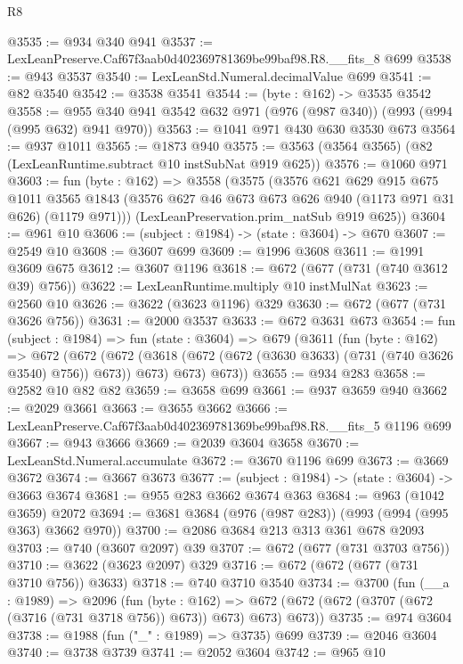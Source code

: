\begin{lexlean}{R8}
\begin{coremodule}
@3535 := @934 @340 @941
@3537 := LexLeanPreserve.Caf67f3aab0d402369781369be99baf98.R8.__fits_8 @699
@3538 := @943 @3537
@3540 := LexLeanStd.Numeral.decimalValue @699
@3541 := @82 @3540
@3542 := @3538 @3541
@3544 := (byte : @162) -> @3535 @3542
@3558 := @955 @340 @941 @3542 @632 @971 (@976 (@987 @340)) (@993 (@994 (@995 @632) @941 @970))
@3563 := @1041 @971 @430 @630 @3530 @673
@3564 := @937 @1011
@3565 := @1873 @940
@3575 := @3563 (@3564 @3565) (@82 (LexLeanRuntime.subtract @10 instSubNat @919 @625))
@3576 := @1060 @971
@3603 := fun (byte : @162) =>
  @3558
    (@3575
      (@3576
        @621
        @629
        @915
        @675
        @1011
        @3565
        @1843
        (@3576 @627 @46 @673 @673 @626 @940 (@1173 @971 @31 @626) (@1179 @971)))
      (LexLeanPreservation.prim_natSub @919 @625))
@3604 := @961 @10
@3606 := (subject : @1984) -> (state : @3604) -> @670
@3607 := @2549 @10
@3608 := @3607 @699
@3609 := @1996 @3608
@3611 := @1991 @3609 @675
@3612 := @3607 @1196
@3618 := @672 (@677 (@731 (@740 @3612 @39) @756))
@3622 := LexLeanRuntime.multiply @10 instMulNat
@3623 := @2560 @10
@3626 := @3622 (@3623 @1196) @329
@3630 := @672 (@677 (@731 @3626 @756))
@3631 := @2000 @3537
@3633 := @672 @3631 @673
@3654 := fun (subject : @1984) =>
  fun (state : @3604) =>
  @679
    (@3611
      (fun (byte : @162) =>
      @672
        (@672
          (@672 (@3618 (@672 (@672 (@3630 @3633) (@731 (@740 @3626 @3540) @756)) @673)) @673)
          @673)
        @673))
@3655 := @934 @283
@3658 := @2582 @10 @82 @82
@3659 := @3658 @699
@3661 := @937 @3659 @940
@3662 := @2029 @3661
@3663 := @3655 @3662
@3666 := LexLeanPreserve.Caf67f3aab0d402369781369be99baf98.R8.__fits_5 @1196 @699
@3667 := @943 @3666
@3669 := @2039 @3604 @3658
@3670 := LexLeanStd.Numeral.accumulate
@3672 := @3670 @1196 @699
@3673 := @3669 @3672
@3674 := @3667 @3673
@3677 := (subject : @1984) -> (state : @3604) -> @3663 @3674
@3681 := @955 @283 @3662 @3674 @363
@3684 := @963 (@1042 @3659) @2072
@3694 := @3681 @3684 (@976 (@987 @283)) (@993 (@994 (@995 @363) @3662 @970))
@3700 := @2086 @3684 @213 @313 @361 @678 @2093
@3703 := @740 (@3607 @2097) @39
@3707 := @672 (@677 (@731 @3703 @756))
@3710 := @3622 (@3623 @2097) @329
@3716 := @672 (@672 (@677 (@731 @3710 @756)) @3633)
@3718 := @740 @3710 @3540
@3734 := @3700
    (fun (__a : @1989) =>
    @2096
      (fun (byte : @162) =>
      @672 (@672 (@672 (@3707 (@672 (@3716 (@731 @3718 @756)) @673)) @673) @673) @673))
@3735 := @974 @3604
@3738 := @1988 (fun ("_" : @1989) => @3735) @699
@3739 := @2046 @3604
@3740 := @3738 @3739
@3741 := @2052 @3604
@3742 := @965 @10

\end{coremodule}
\end{lexlean}
